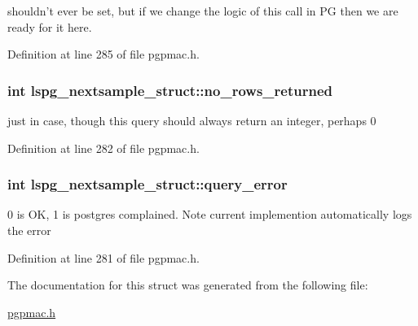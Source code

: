shouldn't ever be set, but if we change the logic of this call in P\-G then we are ready for it here. 



Definition at line 285 of file pgpmac.\-h.

\hypertarget{structlspg__nextsample__struct_aeee8110133db9f1895237ed9b54dd873}{
\subsubsection[{no\-\_\-rows\-\_\-returned}]{\setlength{\rightskip}{0pt plus 5cm}int lspg\-\_\-nextsample\-\_\-struct\-::no\-\_\-rows\-\_\-returned}}\label{structlspg__nextsample__struct_aeee8110133db9f1895237ed9b54dd873}


just in case, though this query should always return an integer, perhaps 0 



Definition at line 282 of file pgpmac.\-h.

\hypertarget{structlspg__nextsample__struct_ade2772532d53709c5144d07332966a4a}{
\subsubsection[{query\-\_\-error}]{\setlength{\rightskip}{0pt plus 5cm}int lspg\-\_\-nextsample\-\_\-struct\-::query\-\_\-error}}\label{structlspg__nextsample__struct_ade2772532d53709c5144d07332966a4a}


0 is O\-K, 1 is postgres complained. Note current implemention automatically logs the error 



Definition at line 281 of file pgpmac.\-h.



The documentation for this struct was generated from the following file\-:\begin{DoxyCompactItemize}
\item 
\hyperlink{pgpmac_8h}{pgpmac.\-h}\end{DoxyCompactItemize}
